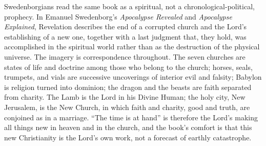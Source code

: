 \medskip
{}

Swedenborgians read the same book as a spiritual, not a chronological-political, prophecy. In Emanuel Swedenborg's {\it Apocalypse Revealed} and {\it Apocalypse Explained}, Revelation describes the end of a corrupted church and the Lord's establishing of a new one, together with a last judgment that, they hold, was accomplished in the spiritual world rather than as the destruction of the physical universe. The imagery is correspondence throughout. The seven churches are states of life and doctrine among those who belong to the church; horses, seals, trumpets, and vials are successive uncoverings of interior evil and falsity; Babylon is religion turned into dominion; the dragon and the beasts are faith separated from charity. The Lamb is the Lord in his Divine Human; the holy city, New Jerusalem, is the New Church, in which faith and charity, good and truth, are conjoined as in a marriage. ``The time is at hand'' is therefore the Lord's making all things new in heaven and in the church, and the book's comfort is that this new Christianity is the Lord's own work, not a forecast of earthly catastrophe.
